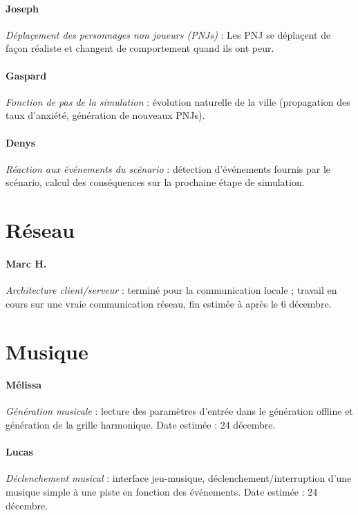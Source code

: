 \documentclass[a4paper]{article}
\begin{document}
\paragraph{Joseph} \emph{Déplaçement des personnages non joueurs (PNJs)} : Les PNJ se déplaçent de façon réaliste et changent de comportement quand ils ont peur.

\paragraph{Gaspard} \emph{Fonction de pas de la simulation} : évolution naturelle de la ville (propagation des taux d'anxiété, génération de nouveaux PNJs).

\paragraph{Denys} \emph{Réaction aux événements du scénario} : détection d'événements fournis par le scénario, calcul des conséquences sur la prochaine étape de simulation.

\section{Réseau}
\paragraph{Marc H.} \emph{Architecture client/serveur} : terminé pour la communication locale ; travail en cours sur une vraie communication réseau, fin estimée à après le 6 décembre.

\section{Musique}
\paragraph{Mélissa} \emph{Génération musicale} : lecture des paramètres d'entrée dans le génération offline et génération de la grille harmonique. Date estimée : 24 décembre.

\paragraph{Lucas} \emph{Déclenchement musical} : interface jeu-musique, déclenchement/interruption d'une musique simple à une piste en fonction des événements. Date estimée : 24 décembre.
\end{document}
